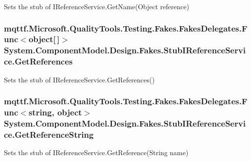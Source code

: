 Sets the stub of I\-Reference\-Service.\-Get\-Name(\-Object reference)

\hypertarget{class_system_1_1_component_model_1_1_design_1_1_fakes_1_1_stub_i_reference_service_ad3c8717253a2f5a681fe8fd483038519}{
\subsubsection[{Get\-References}]{\setlength{\rightskip}{0pt plus 5cm}mqttf.\-Microsoft.\-Quality\-Tools.\-Testing.\-Fakes.\-Fakes\-Delegates.\-Func$<$object\mbox{[}$\,$\mbox{]}$>$ System.\-Component\-Model.\-Design.\-Fakes.\-Stub\-I\-Reference\-Service.\-Get\-References}}\label{class_system_1_1_component_model_1_1_design_1_1_fakes_1_1_stub_i_reference_service_ad3c8717253a2f5a681fe8fd483038519}


Sets the stub of I\-Reference\-Service.\-Get\-References()

\hypertarget{class_system_1_1_component_model_1_1_design_1_1_fakes_1_1_stub_i_reference_service_a7cacca4388e5e59ac8f69bdf3e02aa0c}{
\subsubsection[{Get\-Reference\-String}]{\setlength{\rightskip}{0pt plus 5cm}mqttf.\-Microsoft.\-Quality\-Tools.\-Testing.\-Fakes.\-Fakes\-Delegates.\-Func$<$string, object$>$ System.\-Component\-Model.\-Design.\-Fakes.\-Stub\-I\-Reference\-Service.\-Get\-Reference\-String}}\label{class_system_1_1_component_model_1_1_design_1_1_fakes_1_1_stub_i_reference_service_a7cacca4388e5e59ac8f69bdf3e02aa0c}


Sets the stub of I\-Reference\-Service.\-Get\-Reference(\-String name)

